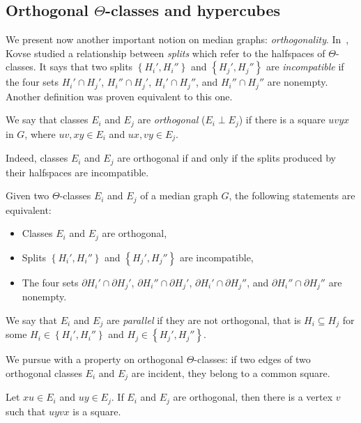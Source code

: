 \documentclass[a4paper,UKenglish,numberwithinsect,cleveref, autoref]{lipics-v2021}
\newcommand{\set}[1]{\left\{ #1 \right\}}
\begin{document}
\subsection{Orthogonal $\Theta$-classes and hypercubes} \label{asubsec:orthogonal}

We present now another important notion on median graphs: \textit{orthogonality}. In~\cite{Ko09}, Kovse studied a relationship between \textit{splits} which refer to the halfspaces of $\Theta$-classes. It says that two splits $\set{H_i',H_i''}$ and $\set{H_j',H_j''}$ are \textit{incompatible} if the four sets $H_i' \cap H_j'$, $H_i'' \cap H_j'$, $H_i' \cap H_j''$, and $H_i'' \cap H_j''$ are nonempty. Another definition was proven equivalent to this one.

\begin{definition}
We say that classes $E_i$ and $E_j$ are {\em orthogonal} ($E_i \perp E_j$) if there is a square $uvyx$ in $G$, where $uv,xy \in E_i$ and $ux,vy \in E_j$.
\end{definition}

Indeed, classes $E_i$ and $E_j$ are orthogonal if and only if the splits produced by their halfspaces are incompatible.

\begin{lemma} Given two $\Theta$-classes $E_i$ and $E_j$ of a median graph $G$, the following statements are equivalent:
\begin{itemize}
    \item Classes $E_i$ and $E_j$ are orthogonal,
    \item Splits $\set{H_i',H_i''}$ and $\set{H_j',H_j''}$ are incompatible,
    \item The four sets $\partial H_i' \cap \partial H_j'$, $\partial H_i'' \cap \partial H_j'$, $\partial H_i' \cap \partial H_j''$, and $\partial H_i'' \cap \partial H_j''$ are nonempty.
\end{itemize}
\label{le:perp_incomp}
\end{lemma}

We say that $E_i$ and $E_j$ are \textit{parallel} if they are not orthogonal, that is $H_i \subseteq H_j$ for some $H_i \in \set{H_i',H_i''}$ and $H_j \in \set{H_j',H_j''}$. 

We pursue with a property on orthogonal $\Theta$-classes: if two edges of two orthogonal classes $E_i$ and $E_j$ are incident, they belong to a common square.

\begin{lemma}
Let $xu \in E_i$ and $uy \in E_j$. If $E_i$ and $E_j$ are orthogonal, then there is a vertex $v$ such that $uyvx$ is a square.
\label{le:squares}
\end{lemma}
\end{document}
